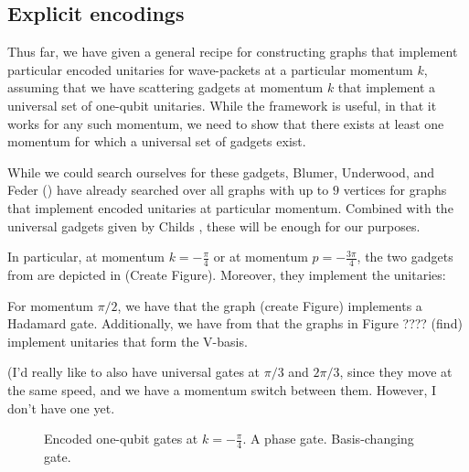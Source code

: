 \documentclass[../thesis-main/thesis-main]{subfiles}
\begin{document}
\subsection{Explicit encodings}\label{sec:explicit_encodings}


Thus far, we have given a general recipe for constructing graphs that implement particular encoded unitaries for wave-packets at a particular momentum $k$, assuming that we have scattering gadgets at momentum $k$ that implement a universal set of one-qubit unitaries.  While the framework is useful, in that it works for any such momentum, we need to show that there exists at least one momentum for which a universal set of gadgets exist.  

While we could search ourselves for these gadgets, Blumer, Underwood, and Feder (\cite{BUF11}) have already searched over all graphs with up to $9$ vertices for graphs that implement encoded unitaries at particular momentum.  Combined with the universal gadgets given by Childs \cite{Chi09}, these will be enough for our purposes.

In particular, at momentum $k = -\frac{\pi}{4}$ or at momentum $p = - \frac{3\pi}{4}$, the two gadgets from \cite{Chi09} are depicted in 
(Create Figure).  Moreover, they implement the unitaries:

For momentum $\pi/2$, we have that the graph (create Figure) implements a Hadamard gate.  Additionally, we have from \cite{BUF11} that the graphs in Figure ???? (find) implement unitaries that form the V-basis.

(I'd really like to also have universal gates at $\pi/3$ and $2\pi/3$, since they move at the same speed, and we have a momentum switch between them.  However, I don't have one yet.

\begin{figure}
  \centering
  \qquad
   \caption{Encoded one-qubit gates at $k = -\frac{\pi}{4}$.    A phase gate.    Basis-changing gate.}
   \label{fig:pi_4_universal}
\end{figure}
\end{document}
